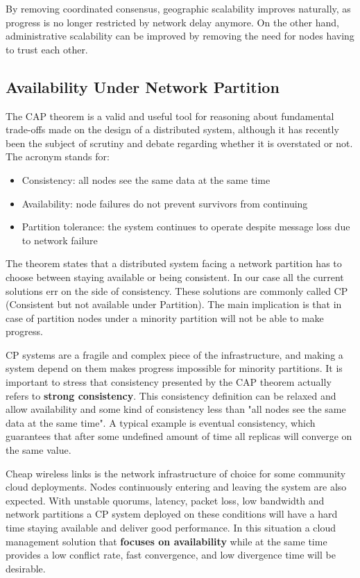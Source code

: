 \documentclass{sig-alternate}
\begin{document}
By removing coordinated consensus, geographic scalability improves naturally, as progress is no longer restricted by network delay anymore. On the other hand, administrative scalability can be improved by removing the need for nodes having to trust each other. 

\subsection{Availability Under Network Partition}

The CAP theorem is a valid and useful tool for reasoning about fundamental trade-offs made on the design of a distributed system\cite{brewer2012cap}, although it has recently been the subject of scrutiny and debate regarding whether it is overstated or not\cite{Kleppmann:CAP}. The acronym stands for:

\begin{itemize}
\item Consistency: all nodes see the same data at the same time
\item Availability: node failures do not prevent survivors from continuing
\item Partition tolerance: the system continues to operate despite message loss due to network failure
\end{itemize}

The theorem states that a distributed system facing a network partition has to choose between staying available or being consistent. In our case all the current solutions err on the side of consistency. These solutions are commonly called CP (Consistent but not available under Partition). The main implication is that in case of partition nodes under a minority partition will not be able to make progress.

CP systems are a fragile and complex piece of the infrastructure, and making a system depend on them makes progress impossible for minority partitions. It is important to stress that consistency presented by the CAP theorem actually refers to \textbf{strong consistency}. This consistency definition can be relaxed and allow availability and some kind of consistency less than "all nodes see the same data at the same time". A typical example is eventual consistency, which guarantees that after some undefined amount of time all replicas will converge on the same value.

Cheap wireless links is the network infrastructure of choice for some community cloud deployments. Nodes continuously entering and leaving the system are also expected. With unstable quorums, latency, packet loss, low bandwidth and network partitions a CP system deployed on these conditions will have a hard time staying available and deliver good performance. In this situation a cloud management solution that \textbf{focuses on availability} while at the same time provides a low conflict rate, fast convergence, and low divergence time will be desirable.
\end{document}
